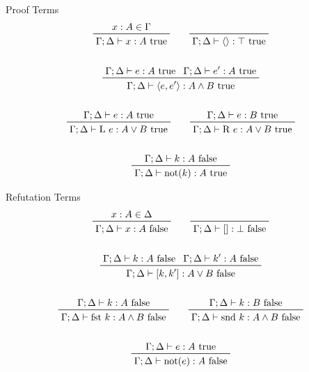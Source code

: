 \documentclass[a4paper,11pt]{article}
\begin{document}
{{        \begin{minipage}[t]{0.49\textwidth}
        \footnotesize
        \centering
        Proof Terms
        \begin{gather*}
        \prftree[r]{}
        {x:A\in\Gamma}
        {\Gamma;\Delta\vdash x:A\text{ true}}
        \qquad
        \prftree[r]{}
        {\Gamma;\Delta\vdash \langle\rangle:\top\text{ true}}
        \\
        \\
        \prftree[r]{}
        {\Gamma;\Delta\vdash e :A\text{ true}}
        {\Gamma;\Delta\vdash e' :A\text{ true}}
        {\Gamma;\Delta\vdash \langle e,e' \rangle :A \wedge B\text{ true}}
        \\
        \\
        \prftree[r]{}
        {\Gamma;\Delta\vdash e:A\text{ true}}
        {\Gamma;\Delta\vdash \text{L }e:A \vee B\text{ true}}
        \qquad
        \prftree[r]{}
        {\Gamma;\Delta\vdash e:B\text{ true}}
        {\Gamma;\Delta\vdash \text{R }e:A \vee B\text{ true}}
        \\
        \\
        \prftree[r]{}
        {\Gamma;\Delta\vdash k:A\text{ false}}
        {\Gamma;\Delta\vdash \text{not}(k):A\text{ true}}
        \\
        \end{gather*}
        \end{minipage}
        \begin{minipage}[t]{0.49\textwidth}
        \footnotesize
        \centering
        Refutation Terms
        \begin{gather*}
        \prftree[r]{}
        {x:A\in\Delta}
        {\Gamma;\Delta\vdash x:A\text{ false}}
        \qquad
        \prftree[r]{}
        {\Gamma;\Delta\vdash []:\bot\text{ false}}
        \\
        \\
        \prftree[r]{}
        {\Gamma;\Delta\vdash k :A\text{ false}}
        {\Gamma;\Delta\vdash k' :A\text{ false}}
        {\Gamma;\Delta\vdash [k,k'] :A \vee B \text{ false}}
        \\
        \\
        \prftree[r]{}
        {\Gamma;\Delta\vdash k:A\text{ false}}
        {\Gamma;\Delta\vdash \text{fst }k:A \wedge B\text{ false}}
        \qquad
        \prftree[r]{}
        {\Gamma;\Delta\vdash k:B\text{ false}}
        {\Gamma;\Delta\vdash \text{snd }k:A \wedge B\text{ false}}
        \\
        \\
        \prftree[r]{}
        {\Gamma;\Delta\vdash e:A\text{ true}}
        {\Gamma;\Delta\vdash \text{not}(e):A\text{ false}}
        \\
        \end{gather*}
        \end{minipage}

}}
\end{document}
